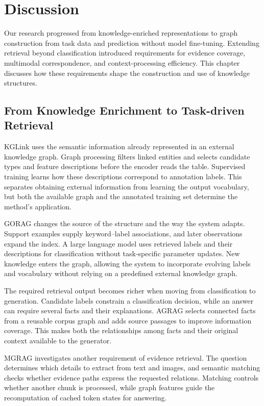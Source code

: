 \chapter{Discussion}
\label{ch:discussion}

Our research progressed from knowledge-enriched representations to graph construction from task data and prediction without model fine-tuning. Extending retrieval beyond classification introduced requirements for evidence coverage, multimodal correspondence, and context-processing efficiency. This chapter discusses how these requirements shape the construction and use of knowledge structures.

\section{From Knowledge Enrichment to Task-driven Retrieval}
\label{sec:discussion:pipeline}
KGLink uses the semantic information already represented in an external knowledge graph. Graph processing filters linked entities and selects candidate types and feature descriptions before the encoder reads the table. Supervised training learns how these descriptions correspond to annotation labels. This separates obtaining external information from learning the output vocabulary, but both the available graph and the annotated training set determine the method's application.

GORAG changes the source of the structure and the way the system adapts. Support examples supply keyword--label associations, and later observations expand the index. A large language model uses retrieved labels and their descriptions for classification without task-specific parameter updates. New knowledge enters the graph, allowing the system to incorporate evolving labels and vocabulary without relying on a predefined external knowledge graph.

The required retrieval output becomes richer when moving from classification to generation. Candidate labels constrain a classification decision, while an answer can require several facts and their explanations. AGRAG selects connected facts from a reusable corpus graph and adds source passages to improve information coverage. This makes both the relationships among facts and their original context available to the generator.

\begin{samepage}
MGRAG investigates another requirement of evidence retrieval. The question determines which details to extract from text and images, and semantic matching checks whether evidence paths express the requested relations. Matching controls whether another chunk is processed, while graph features guide the recomputation of cached token states for answering.\par
\end{samepage}

